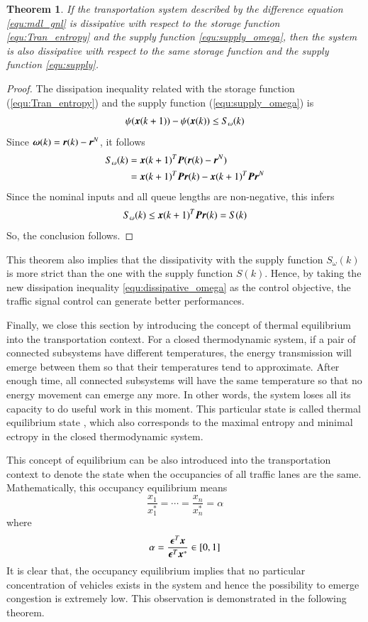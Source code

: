 \documentclass[preprint,authoryear,12pt]{elsarticle}
\renewcommand{\vec}[1]{\mbox{\boldmath$#1$}}
\newcommand{\mat}[1]{\mbox{\boldmath$#1$}}
\newtheorem{thm}{Theorem}
\begin{document}
\begin{thm}
If the transportation system described by the difference equation \eqref{equ:mdl_gnl} is dissipative with respect to the storage function \eqref{equ:Tran_entropy} and the supply function \eqref{equ:supply_omega}, then the system is also dissipative with respect to the same storage function and the supply function \eqref{equ:supply}.
\end{thm}
\begin{proof}
The dissipation inequality related with the storage function (\ref{equ:Tran_entropy}) and the supply function
(\ref{equ:supply_omega}) is
\begin{equation}\label{equ:dissipative_omega}
  \psi(\vec{x}(k+1))-\psi(\vec{x}(k)) \leq S_\omega(k)
\end{equation}
Since $\vec{\omega}(k)=\vec{r}(k)-\vec{r}^N$, it follows
\begin{align*}
S_\omega(k) &= \vec{x}(k+1)^T \mat{P} (\vec{r}(k)-\vec{r}^N)\\
    &= \vec{x}(k+1)^T \mat{P} \vec{r}(k)-\vec{x}(k+1)^T\mat{P}\vec{r}^N
\end{align*}
Since the nominal inputs and all queue lengths are non-negative, this infers
$$S_\omega(k)\leq \vec{x}(k+1)^T \mat{P} \vec{r}(k) = S(k)$$
So, the conclusion follows.
\end{proof}
This theorem also implies that the dissipativity with the supply function $S_\omega(k)$ is more strict than the one with the supply function $S(k)$. Hence, by taking the new dissipation inequality \eqref{equ:dissipative_omega} as the control objective, the traffic signal control can generate better performances.

Finally, we close this section by introducing the concept of thermal equilibrium into the transportation context. For a closed thermodynamic system, if a pair of connected subsystems have different temperatures, the energy transmission will emerge between them so that their temperatures tend to approximate. After enough time, all connected subsystems will have the same temperature so that no energy movement can emerge any more. In other words, the system loses all its capacity to do useful work in this moment. This particular state is called thermal equilibrium state \citep{cengel_thermodynamics:_2001}, which also corresponds to the maximal entropy and minimal ectropy in the closed thermodynamic system.

This concept of equilibrium can be also introduced into the transportation context to denote the state when the occupancies of all traffic lanes are the same. Mathematically, this occupancy equilibrium means
\begin{equation}\label{equ:equilibrium}
\frac{x_1}{x_1^*}=\cdots=\frac{x_n}{x_n^*}=\alpha
\end{equation}
where
$$\alpha = \frac{\vec{\epsilon}^T\vec{x}}{\vec{\epsilon}^T\vec{x}^*}
\in[0,1]$$
It is clear that, the occupancy equilibrium  implies that no particular concentration of vehicles exists in the system and hence the possibility to emerge congestion is extremely low. This observation is demonstrated in the following theorem.
\end{document}
